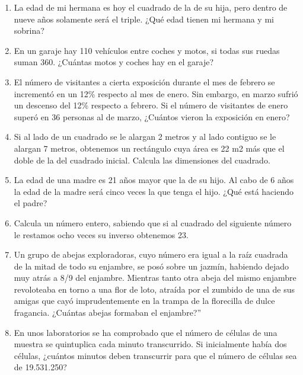 \documentclass[11pt,a4paper]{article}
\begin{document}
\begin{enumerate}
    \item La edad de mi hermana es hoy el cuadrado de la de su hija, pero dentro de nueve años solamente será el triple. ¿Qué edad tienen mi hermana y mi sobrina?
    \item En un garaje hay 110 vehículos entre coches y motos, si todas sus ruedas suman 360. ¿Cuántas motos y coches hay en el garaje?
    \item  El número de visitantes a cierta exposición durante el mes de febrero se incrementó en un 12\% respecto al mes de enero. Sin embargo, en marzo sufrió un descenso del 12\% respecto a febrero. Si el número de visitantes de enero superó en 36 personas al de marzo, ¿Cuántos vieron la exposición en enero?
    \item Si al lado de un cuadrado se le alargan 2 metros y al lado contiguo se le alargan 7 metros, obtenemos un rectángulo cuya área es 22 m2 más que el doble de la del cuadrado inicial. Calcula las dimensiones del cuadrado.
    \item  La edad de una madre es 21 años mayor que la de su hijo. Al cabo de 6 años la edad de la madre será cinco veces la que tenga el hijo. ¿Qué está haciendo el padre?
    \item  Calcula un número entero, sabiendo que si al cuadrado del siguiente número le restamos ocho veces su inverso obtenemos 23.
    \item Un grupo de abejas exploradoras, cuyo número era igual a la raíz cuadrada de la mitad de todo su enjambre, se posó sobre un jazmín, habiendo dejado muy atrás a 8/9 del enjambre. Mientras tanto otra abeja del mismo enjambre revoloteaba en torno a una flor de loto, atraída por el zumbido de una de sus amigas que cayó imprudentemente en la trampa de la florecilla de dulce fragancia. ¿Cuántas abejas formaban el enjambre?”
    \item En unos laboratorios se ha comprobado que el número de células de una muestra se quintuplica cada minuto transcurrido. Si inicialmente había dos células, ¿cuántos minutos deben transcurrir para que el número de células sea de 19.531.250?

\end{enumerate}
\end{document}
